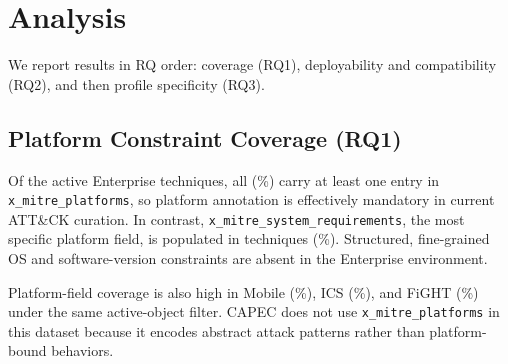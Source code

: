 \documentclass[sigconf]{acmart}
\begin{document}
\section{Analysis}\label{sec:analysis}


We report results in RQ order: coverage (RQ1), deployability and compatibility (RQ2), and then profile specificity (RQ3).

\subsection{Platform Constraint Coverage (RQ1)}

Of the \enterpriseplatformcount{} active Enterprise techniques, all \enterpriseplatformcount{} (\enterpriseplatformpct\%) carry at least one entry in \texttt{x\_mitre\_platforms}, so platform annotation is effectively mandatory in current ATT\&CK curation. In contrast, \texttt{x\_mitre\_system\_requirements}, the most specific platform field, is populated in \enterprisesystemrequirementscount{} techniques (\enterprisesystemrequirementspct\%). Structured, fine-grained OS and software-version constraints are absent in the Enterprise environment.

Platform-field coverage is also high in Mobile (\mobileplatformpct\%), ICS (\icsplatformpercentage\%), and FiGHT (\fightplatformpercentage\%) under the same active-object filter. CAPEC does not use \texttt{x\_mitre\_platforms} in this dataset because it encodes abstract attack patterns rather than platform-bound behaviors.
\end{document}
